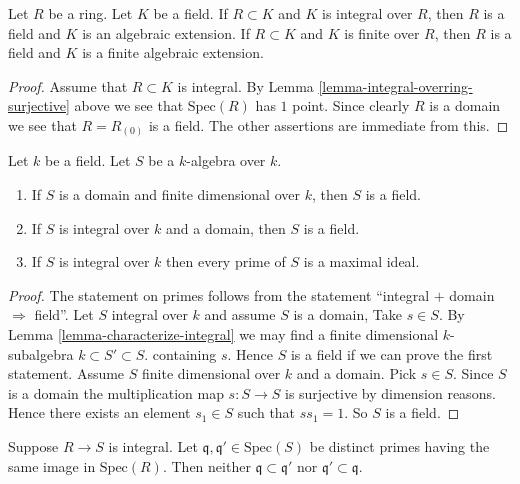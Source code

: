 \begin{lemma}
\label{lemma-integral-under-field}
Let $R$ be a ring. Let $K$ be a field.
If $R \subset K$ and $K$ is integral over $R$,
then $R$ is a field and $K$ is an algebraic extension.
If $R \subset K$ and $K$ is finite over $R$,
then $R$ is a field and $K$ is a finite algebraic extension.
\end{lemma}

\begin{proof}
Assume that $R \subset K$ is integral.
By Lemma \ref{lemma-integral-overring-surjective} above we see that
$\text{Spec}(R)$ has $1$ point. Since clearly $R$ is a domain we see
that $R = R_{(0)}$ is a field. The other assertions are immediate
from this.
\end{proof}

\begin{lemma}
\label{lemma-integral-over-field}
Let $k$ be a field. Let $S$ be a $k$-algebra over $k$.
\begin{enumerate}
\item If $S$ is a domain and finite dimensional over $k$,
then $S$ is a field.
\item If $S$ is integral over $k$ and a domain,
then $S$ is a field.
\item If $S$ is integral over $k$ then every prime of
$S$ is a maximal ideal.
\end{enumerate}
\end{lemma}

\begin{proof}
The statement on primes follows from the statement
``integral $+$ domain $\Rightarrow$ field''.
Let $S$ integral over $k$ and assume $S$ is a domain,
Take $s \in S$. By Lemma
\ref{lemma-characterize-integral} we may find a 
finite dimensional $k$-subalgebra $k \subset S' \subset S$.
containing $s$. Hence $S$ is a field if we can prove the
first statement. Assume $S$ finite dimensional
over $k$ and a domain. Pick $s\in S$.
Since $S$ is a domain the multiplication
map $s : S \to S$ is surjective by dimension
reasons. Hence there exists an element $s_1 \in S$
such that $ss_1 = 1$. So $S$ is a field.
\end{proof}

\begin{lemma}
\label{lemma-integral-no-inclusion}
Suppose $R \to S$ is integral.
Let $\mathfrak q, \mathfrak q' \in \text{Spec}(S)$
be distinct primes
having the same image in $\text{Spec}(R)$.
Then neither $\mathfrak q \subset \mathfrak q'$
nor $\mathfrak q' \subset \mathfrak q$.
\end{lemma}

